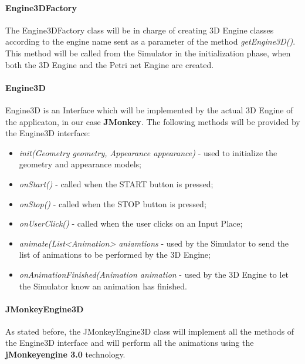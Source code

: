 \paragraph{Engine3DFactory}

The Engine3DFactory class will be in charge of creating 3D Engine classes according to the engine name sent as a parameter of the method \textit{getEngine3D()}. This method will be called from the Simulator in the initialization phase, when both the 3D Engine and the Petri net Engine are created. 

\paragraph{Engine3D}

Engine3D is an Interface which will be implemented by the actual 3D Engine of the applicaton, in our case \textbf{JMonkey}. The following methods will be provided by the Engine3D interface: 
\begin{itemize}
\item \textit{init(Geometry geometry, Appearance appearance)} - used to initialize the geometry and appearance models;
\item \textit{onStart()} - called when the START button is pressed;
\item \textit{onStop()} - called when the STOP button is pressed;
\item \textit{onUserClick()} - called when the user clicks on an Input Place;
\item \textit{animate(List<Animation> aniamtions} - used by the Simulator to send the list of animations to be performed by the 3D Engine;
\item \textit{onAnimationFinished(Animation animation} - used by the 3D Engine to let the Simulator know an animation has finished. 
\end{itemize}

\paragraph{JMonkeyEngine3D}

As stated before, the JMonkeyEngine3D class will implement all the methods of the Engine3D interface and will perform all the animations using the \textbf{jMonkeyengine 3.0} technology.  